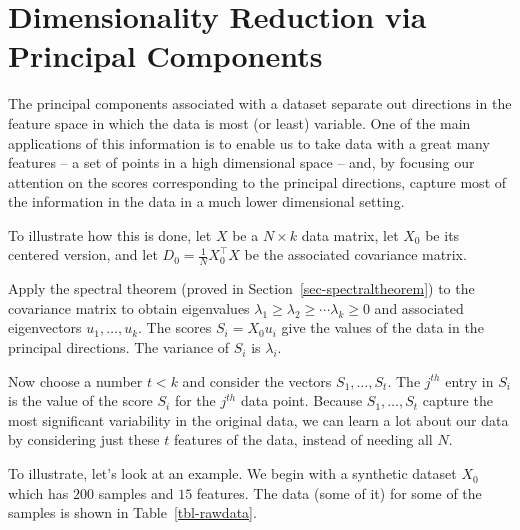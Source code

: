 \documentclass[
  11pt,
  letterpaper,
]{scrbook}
\theoremstyle{plain}
\theoremstyle{remark}
\begin{document}
\hypertarget{dimensionality-reduction-via-principal-components}{%
\section{Dimensionality Reduction via Principal
Components}\label{dimensionality-reduction-via-principal-components}}

The principal components associated with a dataset separate out
directions in the feature space in which the data is most (or least)
variable. One of the main applications of this information is to enable
us to take data with a great many features -- a set of points in a high
dimensional space -- and, by focusing our attention on the scores
corresponding to the principal directions, capture most of the
information in the data in a much lower dimensional setting.

To illustrate how this is done, let \(X\) be a \(N\times k\) data
matrix, let \(X_{0}\) be its centered version, and let
\(D_{0} = \frac{1}{N}X_{0}^{\intercal}X\) be the associated covariance
matrix.

Apply the spectral theorem (proved in Section~\ref{sec-spectraltheorem})
to the covariance matrix to obtain eigenvalues
\(\lambda_{1}\ge \lambda_{2}\ge\cdots \lambda_{k}\ge 0\) and associated
eigenvectors \(u_{1},\ldots, u_{k}\). The scores \(S_{i}=X_{0}u_{i}\)
give the values of the data in the principal directions. The variance of
\(S_{i}\) is \(\lambda_{i}\).

Now choose a number \(t<k\) and consider the vectors
\(S_{1},\ldots, S_{t}\). The \(j^{th}\) entry in \(S_{i}\) is the value
of the score \(S_{i}\) for the \(j^{th}\) data point. Because
\(S_{1},\ldots, S_{t}\) capture the most significant variability in the
original data, we can learn a lot about our data by considering just
these \(t\) features of the data, instead of needing all \(N\).

To illustrate, let's look at an example. We begin with a synthetic
dataset \(X_{0}\) which has \(200\) samples and \(15\) features. The
data (some of it) for some of the samples is shown in
Table~\ref{tbl-rawdata}.
\end{document}
